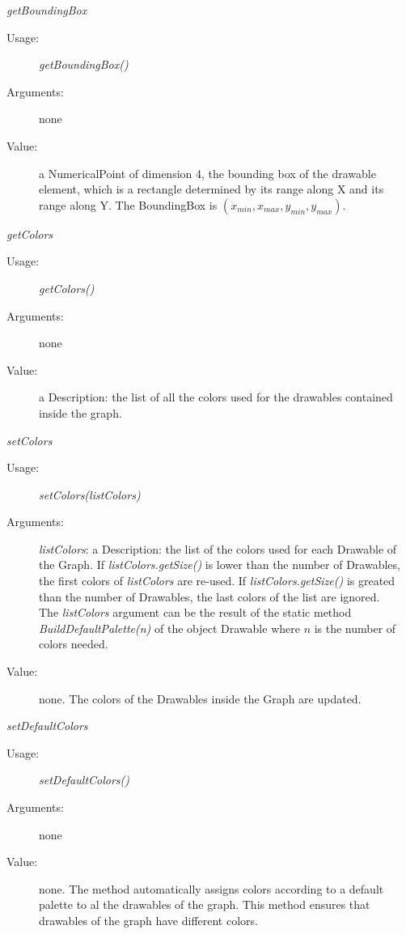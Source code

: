 \begin{description}
\begin{description}
  \item \textit{getBoundingBox}
    \begin{description}
    \item[Usage:] \textit{getBoundingBox()}
    \item[Arguments:] none
    \item[Value:] a NumericalPoint of dimension 4, the bounding box of the drawable element, which is a rectangle determined by its range along X and its range along Y. The BoundingBox is  $(x_{min}, x_{max}, y_{min}, y_{max})$.
    \end{description}
    \bigskip

  \item \textit{getColors}
    \begin{description}
    \item[Usage:] \textit{getColors()}
    \item[Arguments:] none
    \item[Value:] a Description: the list of all the colors used for the drawables contained inside the graph.
    \end{description}
    \bigskip

  \item \textit{setColors}
    \begin{description}
    \item[Usage:] \textit{setColors(listColors)}
    \item[Arguments:] \textit{listColors}: a Description: the list of the colors used for each Drawable of the Graph. If \textit{listColors.getSize()} is lower than the number of Drawables, the first colors of \textit{listColors} are re-used. If \textit{listColors.getSize()} is greated than the number of Drawables, the last colors of the list are ignored.\\
      The \textit{listColors} argument can be the result of the static method \textit{BuildDefaultPalette(n)} of the object Drawable where $n$ is the number of colors needed.
    \item[Value:] none. The colors of the Drawables inside the Graph are updated.
    \end{description}
    \bigskip

  \item \textit{setDefaultColors}
    \begin{description}
    \item[Usage:] \textit{setDefaultColors()}
    \item[Arguments:] none
    \item[Value:] none. The method automatically assigns colors according to a default palette to al the drawables of the graph. This method ensures that drawables of the graph have different colors.
    \end{description}
    \bigskip


\end{description}
\end{description}
